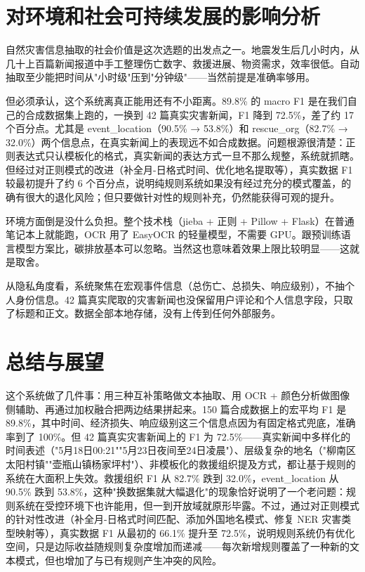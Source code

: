\documentclass[12pt, a4paper]{ctexart}
\begin{document}
\section{对环境和社会可持续发展的影响分析}

自然灾害信息抽取的社会价值是这次选题的出发点之一。地震发生后几小时内，从几十上百篇新闻报道中手工整理伤亡数字、救援进展、物资需求，效率很低。自动抽取至少能把时间从"小时级"压到"分钟级"——当然前提是准确率够用。

但必须承认，这个系统离真正能用还有不小距离。89.8\% 的 macro F1 是在我们自己的合成数据集上跑的，一换到 42 篇真实灾害新闻，F1 降到 72.5\%，差了约 17 个百分点。尤其是 event\_location（90.5\% → 53.8\%）和 rescue\_org（82.7\% → 32.0\%）两个信息点，在真实新闻上的表现远不如合成数据。问题根源很清楚：正则表达式只认模板化的格式，真实新闻的表达方式一旦不那么规整，系统就抓瞎。但经过对正则模式的改进（补全月-日格式时间、优化地名提取等），真实数据 F1 较最初提升了约 6 个百分点，说明纯规则系统如果没有经过充分的模式覆盖，的确有很大的退化风险；但只要做针对性的规则补充，仍然能获得可观的提升。

环境方面倒是没什么负担。整个技术栈（jieba + 正则 + Pillow + Flask）在普通笔记本上就能跑，OCR 用了 EasyOCR 的轻量模型，不需要 GPU。跟预训练语言模型方案比，碳排放基本可以忽略。当然这也意味着效果上限比较明显——这就是取舍。

从隐私角度看，系统聚焦在宏观事件信息（总伤亡、总损失、响应级别），不抽个人身份信息。42 篇真实爬取的灾害新闻也没保留用户评论和个人信息字段，只取了标题和正文。数据全部本地存储，没有上传到任何外部服务。


\section{总结与展望}

这个系统做了几件事：用三种互补策略做文本抽取、用 OCR + 颜色分析做图像侧辅助、再通过加权融合把两边结果拼起来。150 篇合成数据上的宏平均 F1 是 89.8\%，其中时间、经济损失、响应级别这三个信息点因为有固定格式兜底，准确率到了 100\%。但 42 篇真实灾害新闻上的 F1 为 72.5\%——真实新闻中多样化的时间表述（"5月18日00:21""5月23日夜间至24日凌晨"）、层级复杂的地名（"柳南区太阳村镇""壶瓶山镇杨家坪村"）、非模板化的救援组织提及方式，都让基于规则的系统在大面积上失效。救援组织 F1 从 82.7\% 跌到 32.0\%，event\_location 从 90.5\% 跌到 53.8\%，这种"换数据集就大幅退化"的现象恰好说明了一个老问题：规则系统在受控环境下也许能用，但一到开放域就原形毕露。不过，通过对正则模式的针对性改进（补全月-日格式时间匹配、添加外国地名模式、修复 NER 灾害类型映射等），真实数据 F1 从最初的 66.1\% 提升至 72.5\%，说明规则系统仍有优化空间，只是边际收益随规则复杂度增加而递减——每次新增规则覆盖了一种新的文本模式，但也增加了与已有规则产生冲突的风险。
\end{document}
